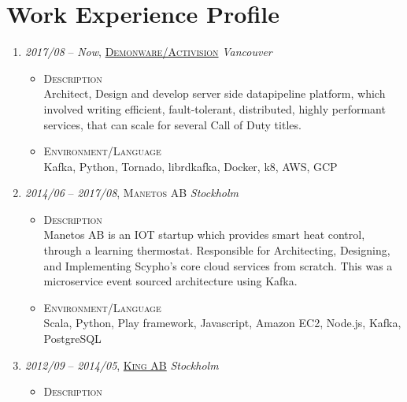 \documentclass[a4paper,10pt]{article}
\begin{document}
  \section{Work Experience Profile}
  \begin{enumerate}

  \item \emph{2017/08} – \emph{Now}, \textsc{\href{https://www.demonware.net/}{Demonware/Activision}} \emph {Vancouver}\\

  \begin{itemize}
    \item \textsc{Description} \\
      Architect, Design and develop server side datapipeline platform,
      which involved writing efficient, fault-tolerant, distributed,
      highly performant services, that can scale for several Call of Duty titles.
      
  \item \textsc{Environment/Language} \\
    Kafka, Python, Tornado, librdkafka, Docker, k8, AWS, GCP

  \end{itemize}


\item \emph{2014/06} – \emph{2017/08}, \textsc{Manetos AB} \emph {Stockholm} \\
    
  \begin{itemize}
    \item \textsc{Description} \\
      Manetos AB is an IOT startup which provides smart heat control, through a learning thermostat. Responsible for Architecting, Designing, and Implementing Scypho's core cloud services from scratch. This was a microservice event sourced architecture using Kafka.
   
  \item \textsc{Environment/Language} \\
    Scala, Python, Play framework, Javascript, Amazon EC2, Node.js, Kafka, PostgreSQL

 \end{itemize}
   
\item \emph{2012/09} – \emph{2014/05}, \textsc{\href{www.king.com}{King AB}} \emph{Stockholm} \\
  \begin{itemize}
    \item \textsc{Description} \\
  

\end{itemize}
\end{enumerate}
\end{document}
